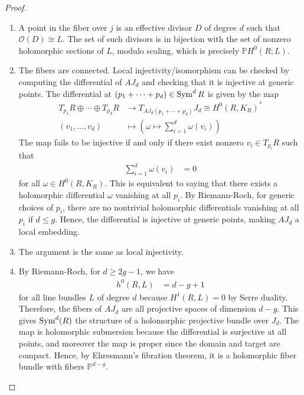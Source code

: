 \documentclass[12pt]{article}
\begin{document}
\begin{proof}
    \leavevmode
    \begin{enumerate}
        \item A point in the fiber over $j$ is an effective divisor $D$ of degree $d$
              such that $\mathcal{O}(D) \cong L$.
              The set of such divisors is in bijection with the set of nonzero holomorphic sections
              of $L$, modulo scaling,
              which is precisely $\mathbb{P}H^0(R;L)$.
        \item The fibers are connected. Local injectivity/isomorphism can be checked by computing the differential of $AJ_d$ and checking that it is injective at generic points. The differential at $(p_1 + \cdots + p_d) \in \operatorname{Sym}^d R$ is given by the map \begin{align*}
                  T_{p_1} R \oplus \cdots \oplus T_{p_d} R & \to T_{AJ_d(p_1 + \cdots + p_d)} J_d \cong H^0(R, K_R)^*       \\
                  (v_1, \ldots, v_d)                       & \mapsto \left( \omega \mapsto \sum_{i=1}^d \omega(v_i) \right)
              \end{align*} The map fails to be injective if and only if there exist nonzero $v_i \in T_{p_i} R$ such that \begin{align*}
                  \sum_{i=1}^d \omega(v_i) & = 0
              \end{align*} for all $\omega \in H^0(R, K_R)$. This is equivalent to saying that there exists a holomorphic differential $\omega$ vanishing at all $p_i$. By Riemann-Roch, for generic choices of $p_i$, there are no nontrivial holomorphic differentials vanishing at all $p_i$ if $d \leq g$. Hence, the differential is injective at generic points, making $AJ_d$ a local embedding.
        \item The argument is the same as local injectivity.
        \item By Riemann-Roch, for $d \geq 2g - 1$, we have \begin{align*}
                  h^0(R, L) & = d - g + 1
              \end{align*} for all line bundles $L$ of degree $d$ because $H^1(R, L) = 0$ by Serre duality. Therefore, the fibers of $AJ_d$ are all projective spaces of dimension $d - g$. This gives $\operatorname{Sym}^d(R)$ the structure of a holomorphic projective bundle over $J_d$. The map is holomorphic submersion because the differential is surjective at all points, and moreover the map is proper since the domain and target are compact. Hence, by Ehresmann's fibration theorem, it is a holomorphic fiber bundle with fibers $\mathbb{P}^{d-g}$.
              \qedhere
    \end{enumerate}
\end{proof}
\end{document}
